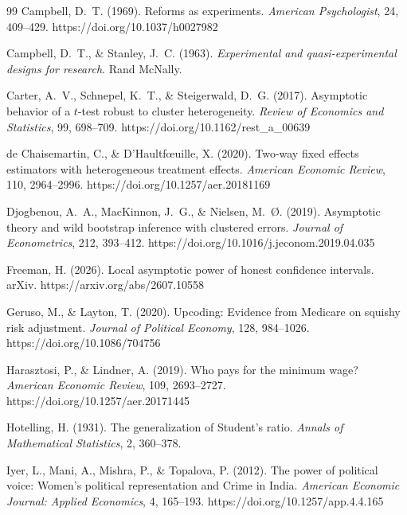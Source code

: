 \documentclass[12pt]{article}
\theoremstyle{definition}
\numberwithin{equation}{section}
\begin{document}
\begin{thebibliography}{99}
 Campbell, D.~T. (1969). Reforms as experiments. \emph{American Psychologist}, 24, 409--429. https://doi.org/10.1037/h0027982

 Campbell, D.~T., \& Stanley, J.~C. (1963). \emph{Experimental and quasi-experimental designs for research}. Rand McNally.

 Carter, A.~V., Schnepel, K.~T., \& Steigerwald, D.~G. (2017). Asymptotic behavior of a $t$-test robust to cluster heterogeneity. \emph{Review of Economics and Statistics}, 99, 698--709. https://doi.org/10.1162/rest\_a\_00639

 de Chaisemartin, C., \& D'Haultf\oe uille, X. (2020). Two-way fixed effects estimators with heterogeneous treatment effects. \emph{American Economic Review}, 110, 2964--2996. https://doi.org/10.1257/aer.20181169

 Djogbenou, A.~A., MacKinnon, J.~G., \& Nielsen, M.~{\O}. (2019). Asymptotic theory and wild bootstrap inference with clustered errors. \emph{Journal of Econometrics}, 212, 393--412. https://doi.org/10.1016/j.jeconom.2019.04.035

 Freeman, H. (2026). Local asymptotic power of honest confidence intervals. arXiv. https://arxiv.org/abs/2607.10558

 Geruso, M., \& Layton, T. (2020). Upcoding: Evidence from Medicare on squishy risk adjustment. \emph{Journal of Political Economy}, 128, 984--1026. https://doi.org/10.1086/704756

 Harasztosi, P., \& Lindner, A. (2019). Who pays for the minimum wage? \emph{American Economic Review}, 109, 2693--2727. https://doi.org/10.1257/aer.20171445

 Hotelling, H. (1931). The generalization of Student's ratio. \emph{Annals of Mathematical Statistics}, 2, 360--378.

 Iyer, L., Mani, A., Mishra, P., \& Topalova, P. (2012). The power of political voice: Women's political representation and Crime in India. \emph{American Economic Journal: Applied Economics}, 4, 165--193. https://doi.org/10.1257/app.4.4.165


\end{thebibliography}
\end{document}
